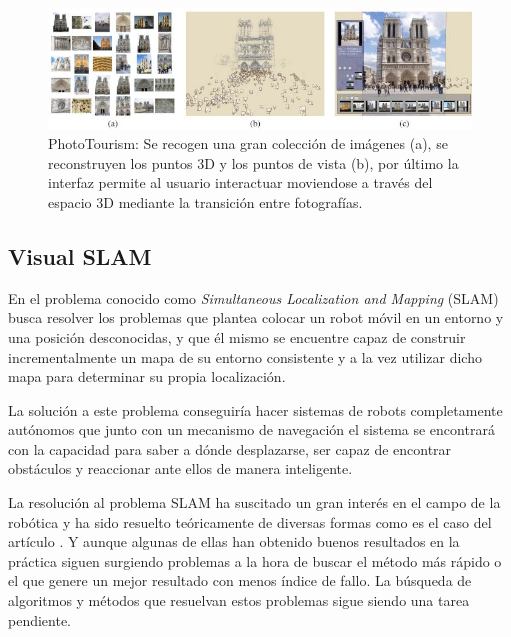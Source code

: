 \begin{figure}[th]
\centering
\includegraphics[scale=0.57]{Figures/phototourism.png}
\decoRule
\caption[PhotoTourism]{PhotoTourism: Se recogen una gran colección de imágenes (a), se reconstruyen los puntos 3D y los puntos de vista (b), por último la interfaz permite al usuario interactuar moviendose a través del espacio 3D mediante la transición entre fotografías.}
\label{fig:Tourism}
\end{figure}

\subsection{Visual SLAM}

En el problema conocido como \textit{Simultaneous Localization and Mapping} (SLAM) busca resolver los problemas que plantea colocar un robot móvil en un entorno y una posición desconocidas, y que él mismo se encuentre capaz de construir incrementalmente un mapa de su entorno consistente y a la vez utilizar dicho mapa para determinar su propia localización.

La solución a este problema conseguiría hacer sistemas de robots completamente autónomos que junto con un mecanismo de navegación el sistema se encontrará con la capacidad para saber a dónde desplazarse, ser capaz de encontrar obstáculos y reaccionar ante ellos de manera inteligente.

La resolución al problema SLAM ha suscitado un gran interés en el campo de la robótica y ha sido resuelto teóricamente de diversas formas como es el caso del artículo \parencite{Reference1}. Y aunque algunas de ellas han obtenido buenos resultados en la práctica siguen surgiendo problemas a la hora de buscar el método más rápido o el que genere un mejor resultado con menos índice de fallo. La búsqueda de algoritmos y métodos que resuelvan estos problemas sigue siendo una tarea pendiente.

